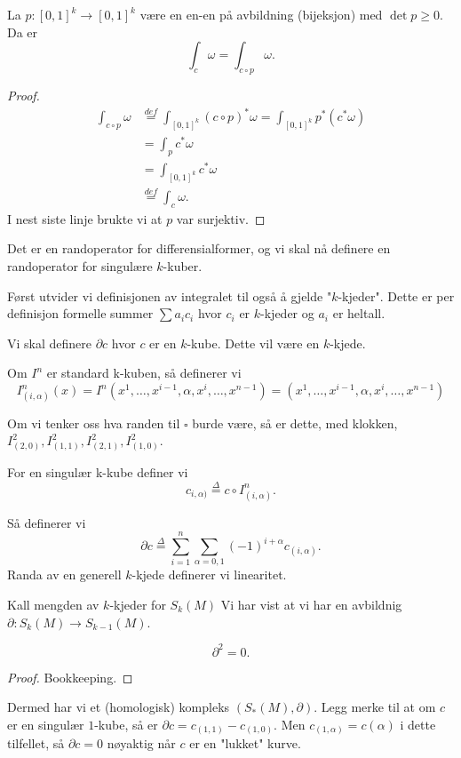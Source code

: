 \documentclass[11pt, english]{article}
\begin{document}
\begin{prop}
La $p:[0,1]^k \to [0,1]^k $ være en en-en på avbildning (bijeksjon) med $\det p \geq 0$. Da er
$$
\int_c \omega = \int_{c \circ p} \omega.
$$
\end{prop}
\begin{proof}
\begin{align*}
\int_{c \circ p} \omega &\stackrel{def}{=} \int_{[0,1]^k} (c \circ p)^\ast \omega = \int_{[0,1]^k} p^\ast(c^\ast \omega) \\
&= \int_p c^\ast \omega \\
&= \int_{[0,1]^k} c^\ast \omega \\
&\stackrel{def}{=} \int_c \omega.
\end{align*}
I nest siste linje brukte vi at $p$ var surjektiv.
\end{proof}

Det er en randoperator for differensialformer, og vi skal nå definere en randoperator for singulære $k$-kuber.

Først utvider vi definisjonen av integralet til også å gjelde "$k$-kjeder". Dette er per definisjon formelle summer $\sum a_i c_i$ hvor $c_i$ er $k$-kjeder og $a_i$ er heltall.

Vi skal definere $\partial c$ hvor $c$ er en $k$-kube. Dette vil være en $k$-kjede. 

Om $I^n$ er standard k-kuben, så definerer vi
$$
I_{(i,\alpha)}^n(x) = I^n(x^1, \ldots, x^{i-1},\alpha,x^i, \ldots, x^{n-1}) = (x^1, \ldots, x^{i-1},\alpha,x^i, \ldots, x^{n-1})
$$

Om vi tenker oss hva randen til $\square$ burde være, så er dette, med klokken, $I_{(2,0)}^2, I_{(1,1)}^2, I_{(2,1)}^2, I_{(1,0)}^2$. 

For en singulær k-kube definer vi
$$
c_{i,\alpha)} \stackrel{\Delta}{=} c \circ I_{(i, \alpha)}^n.
$$

Så definerer vi
$$
\partial c \stackrel \Delta = \sum_{i=1}^n \sum_{\alpha=0,1} (-1)^{i + \alpha} c_{(i,\alpha)}.
$$
Randa av en generell $k$-kjede definerer vi linearitet. 

Kall mengden av $k$-kjeder for $S_k(M)$ Vi har vist at vi har en avbildnig $\partial:S_k(M) \to S_{k-1}(M)$. 

\begin{prop}
$$\partial^2=0.$$
\end{prop}
\begin{proof}
Bookkeeping.
\end{proof}

Dermed har vi et (homologisk) kompleks $(S_\ast(M),\partial)$. Legg merke til at om $c$ er en singulær $1$-kube, så er $\partial c = c_{(1,1)} - c_{(1,0)}$. Men $c_{(1,\alpha)}=c(\alpha)$ i dette tilfellet, så $\partial c=0$ nøyaktig når $c$ er en "lukket" kurve.
\end{document}

